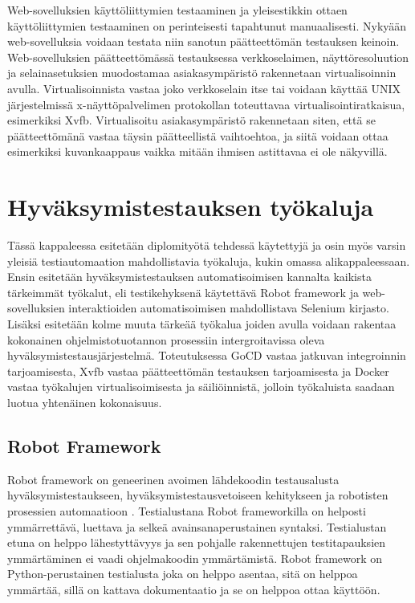   Web-sovelluksien käyttöliittymien testaaminen ja yleisestikkin ottaen käyttöliittymien testaaminen on perinteisesti tapahtunut manuaalisesti.
  Nykyään web-sovelluksia voidaan testata niin sanotun päätteettömän testauksen keinoin.
  Web-sovelluksien päätteettömässä testauksessa verkkoselaimen, näyttöresoluution ja selainasetuksien muodostamaa asiakasympäristö rakennetaan virtualisoinnin avulla.
  Virtualisoinnista vastaa joko verkkoselain itse tai voidaan käyttää UNIX järjestelmissä x-näyttöpalvelimen protokollan toteuttavaa virtualisointiratkaisua, esimerkiksi Xvfb.
  Virtualisoitu asiakasympäristö rakennetaan siten, että se päätteettömänä vastaa täysin päätteellistä vaihtoehtoa, ja siitä voidaan ottaa esimerkiksi kuvankaappaus vaikka mitään ihmisen astittavaa ei ole näkyvillä.

\section{Hyväksymistestauksen työkaluja} \label{ch:08_hyvaksymistestauksen_tyokaluja}

  Tässä kappaleessa esitetään diplomityötä tehdessä käytettyjä ja osin myös varsin yleisiä testiautomaation mahdollistavia työkaluja, kukin omassa alikappaleessaan.
  Ensin esitetään hyväksymistestauksen automatisoimisen kannalta kaikista tärkeimmät työkalut, eli testikehyksenä käytettävä Robot framework ja web-sovelluksien interaktioiden automatisoimisen mahdollistava Selenium kirjasto.
  Lisäksi esitetään kolme muuta tärkeää työkalua joiden avulla voidaan rakentaa kokonainen ohjelmistotuotannon prosessiin intergroitavissa oleva hyväksymistestausjärjestelmä.
  Toteutuksessa GoCD vastaa jatkuvan integroinnin tarjoamisesta, Xvfb vastaa päätteettömän testauksen tarjoamisesta ja Docker vastaa työkalujen virtualisoimisesta ja säiliöinnistä, jolloin työkaluista saadaan luotua yhtenäinen kokonaisuus.

  \subsection{Robot Framework} \label{ch:08_robot_framework}

    Robot framework on geneerinen avoimen lähdekoodin testausalusta hyväksymistestaukseen, hyväksymistestausvetoiseen kehitykseen ja robotisten prosessien automaatioon \parencite{noauthor_robot_nodate}.
    Testialustana Robot frameworkilla on helposti ymmärrettävä, luettava ja selkeä avainsanaperustainen syntaksi.
    Testialustan etuna on helppo lähestyttävyys ja sen pohjalle rakennettujen testitapauksien ymmärtäminen ei vaadi ohjelmakoodin ymmärtämistä.
    Robot framework on Python-perustainen testialusta joka on helppo asentaa, sitä on helppoa ymmärtää, sillä on kattava dokumentaatio ja se on helppoa ottaa käyttöön.

